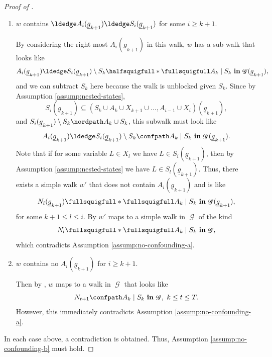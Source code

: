 \documentclass[12pt,a4paper]{article}
\theoremstyle{definition}
\newcommand{\ingraph}[1]{~\textnormal{\bf in}\,#1}
\DeclareMathOperator{\gG}{\mathscr{G}}
\begin{document}
\begin{proof}[Proof of ]
\begin{enumerate}
    \item $w$ contains $\ldedge A_i(\underline{g}_{k+1}) \ldedge
      S_i(\underline{g}_{k+1})$ for some $i \geq k+1$.

    By considering the right-most $A_i(\underline{g}_{k+1})$ in this
    walk, $w$ has a sub-walk that looks like
    \[
        A_i(\underline{g}_{k+1}) \ldedge S_i(\underline{g}_{k+1})
        \setminus S_k \halfsquigfull \ast \fullsquigfull A_k \mid S_k \ingraph{\gG(\underline{g}_{k+1})},
      \]
    and we can subtract $S_k$ here because the walk is unblocked given $S_k$.
    Since by Assumption \ref{assump:nested-states},
    \[
        S_i(\underline{g}_{k+1}) \subseteq (S_k \cup A_k \cup X_{k+1} \cup \dots, A_{i-1} \cup X_i)(\underline{g}_{k+1}),
    \]
    and $S_i(\underline{g}_{k+1}) \setminus S_k \nordpath A_k \cup
    S_k$, this subwalk must look like
    \[
        A_i(\underline{g}_{k+1}) \ldedge S_i(\underline{g}_{k+1})
        \setminus S_k
        \confpath A_k \mid S_k \ingraph{\gG(\underline{g}_{k+1})}.
      \]
    Note that if for some variable $L \in X_l$ we have $L \in
    S_i(\underline{g}_{k+1})$, then by Assumption
    \ref{assump:nested-states} we have $L \in
    S_l(\underline{g}_{k+1})$. Thus, there exists a simple walk $w'$
    that does not contain $A_i(\underline{g}_{k+1})$ and is like
    \[
        N_l(\underline{g}_{k+1}) \fullsquigfull \ast \fullsquigfull A_k \mid S_k \ingraph{\gG(\underline{g}_{k+1})},
    \]
    for some $k + 1 \leq l \leq i$. By  $w'$ maps to
    a simple walk in $\gG$ of the kind
    \[
        N_l \fullsquigfull \ast \fullsquigfull A_k \mid S_k \ingraph{\gG},
    \]
    which contradicts Assumption \ref{assump:no-confounding-a}.

    \item $w$ contains no $A_i(\underline{g}_{k+1})$ for $i \geq k+1$.

    Then by , $w$ maps to a walk in $\gG$ that looks like
    \[
        N_{t+1} \confpath A_k \mid S_k \ingraph{\gG}, ~ k \leq t \leq T.
    \]
    However, this immediately contradicts Assumption \ref{assump:no-confounding-a}.
  \end{enumerate}
  In each case above, a contradiction is obtained. Thus, Assumption
  \ref{assump:no-confounding-b} must hold.
\end{proof}
\end{document}

